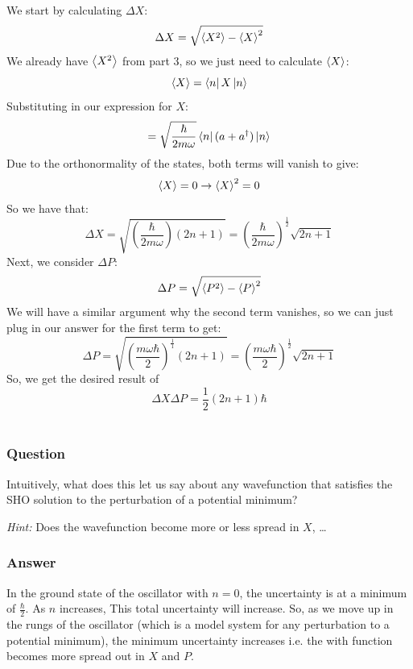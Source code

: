 \documentclass[12pt]{article}
\begin{document}
We start by calculating \(\Delta X\):
\begin{equation}
    \Delta X = \sqrt{\ev{X^2} - \ev{X}^2}
\end{equation}
We already have \(\ev{X^2}\) from part 3, so we just need to calculate \(\ev{X}\):
\begin{equation}
    \ev{X} = \bra{n}X\ket{n}
\end{equation}
Substituting in our expression for \(X\):
\begin{equation}
    = \sqrt{\frac{\hbar}{2m\omega}}\bra{n}(a + a^{\dagger})\ket{n}
\end{equation}
Due to the orthonormality of the states, both terms will vanish to give:
\begin{equation}
    \ev{X} = 0 \rightarrow \ev{X}^2 = 0
\end{equation}
So we have that:
\begin{equation}
    \Delta X = \sqrt{(\frac{\hbar}{2m\omega})(2n + 1)} =\boxed{\left(\frac{\hbar}{2m\omega}\right)^{\frac{1}{2}}\sqrt{2n + 1}}
\end{equation}
Next, we consider \(\Delta P\):
\begin{equation}
    \Delta P = \sqrt{\ev{P^2} - \ev{P}^2}
\end{equation}
We will have a similar argument why the second term vanishes, so we can just plug in our answer for the first term to get:
\begin{equation}
    \Delta P = \sqrt{(\frac{m\omega\hbar}{2})^{\frac{1}{1}}(2n + 1)} =\boxed{\left(\frac{m\omega\hbar}{2}\right)^{\frac{1}{2}}\sqrt{2n + 1}}
\end{equation}
So, we get the desired result of
\begin{equation}
    \boxed{\Delta X \Delta P = \frac{1}{2}(2n + 1)\hbar}
\end{equation}
\\
\subsubsection{Question}
Intuitively, what does this let us say about any wavefunction that satisfies the SHO solution to the perturbation of a potential minimum?

\textit{Hint:} Does the wavefunction become more or less spread in \(X\), \ldots
\subsubsection{Answer}
In the ground state of the oscillator with $n=0$, the uncertainty is at a minimum of $\frac{\hbar}{2}$. As $n$ increases, This total uncertainty will increase. So, as we move up in the rungs of the oscillator (which is a model system for any perturbation to a potential minimum), the minimum uncertainty increases i.e. the with function becomes more spread out in $X$ and $P$.
\end{document}
